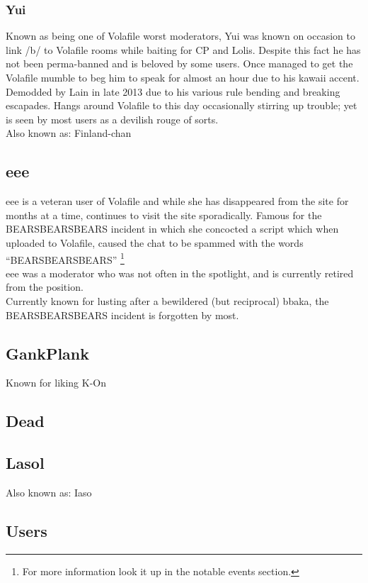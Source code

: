 \documentclass[12pt]{report}
\begin{document}
{\subsubsection{Yui}
	Known as being one of Volafile worst moderators, Yui was known on occasion to link /b/ to Volafile rooms while baiting for CP and Lolis. Despite this fact he has not been perma-banned and is beloved by some users. Once managed to get the Volafile mumble to beg him to speak for almost an hour due to his kawaii accent. Demodded by Lain in late 2013 due to his various rule bending and breaking escapades. Hangs around Volafile to this day occasionally stirring up trouble; yet is seen by most users as a devilish rouge of sorts.
	\\
	Also known as: Finland-chan

\subsection{eee}
	eee is a veteran user of Volafile and while she has disappeared from the site for months at a time, continues to visit the site sporadically. Famous for the BEARSBEARSBEARS incident in which she concocted a script which when uploaded to Volafile, caused the chat to be spammed with the words ``BEARSBEARSBEARS''
	\footnote{For more information look it up in the notable events section.}\\
eee was a moderator who was not often in the spotlight, and is currently retired from the position. \\Currently known for lusting after a bewildered (but reciprocal) bbaka, the BEARSBEARSBEARS incident is forgotten by most.

\subsection{GankPlank}
Known for liking K-On 

\subsection{Dead}
\subsection{Lasol}
Also known as: Iaso
\vfill
\pagebreak

\subsection{Users}


}
\end{document}
